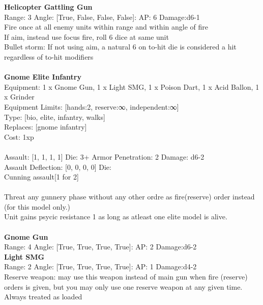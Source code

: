 {\bf Helicopter Gattling Gun } \\



Range: 3  Angle: [True, False, False, False]: AP: 6 Damage:d6-1 \\
Fire once at all enemy units within range and within angle of fire\\ 
If aim, instead use focus fire, roll 6 dice at same unit\\ 
Bullet storm: If not using aim, a natural 6 on to-hit die is considered a hit regardless of to-hit modifiers\\ 




 
\ \\

{\bf Gnome Elite Infantry } \\
Equipment: 1 x Gnome Gun, 1 x Light SMG, 1 x Poison Dart, 1 x Acid Ballon, 1 x Grinder \\
Equipment Limits: [hands:2, reserve:∞, independent:∞] \\
Type: [bio, elite, infantry, walks] \\
Replaces: [gnome infantry] \\
Cost: 1xp\\
\ \\
Assault: [1, 1, 1, 1] Die: 3+ Armor Penetration: 2 Damage: d6-2 \\
Assault Deflection: [0, 0, 0, 0] Die: \\
\indent Cunning assault[1 for 2]\\ 
 
\ \\
Threat any gunnery phase without any other ordre as fire(reserve) order instead (for this model only.)\\ 
Unit gains psycic resistance 1 as long as atleast one elite model is alive.\\ 

\ \\
{\bf Gnome Gun } \\



Range: 4  Angle: [True, True, True, True]: AP: 2 Damage:d6-2 \\




{\bf Light SMG } \\



Range: 2  Angle: [True, True, True, True]: AP: 1 Damage:d4-2 \\
Reserve weapon: may use this weapon instead of main gun when fire (reserve) orders is given, but you may only use one reserve weapon at any given time.\\ 
Always treated as loaded\\ 




